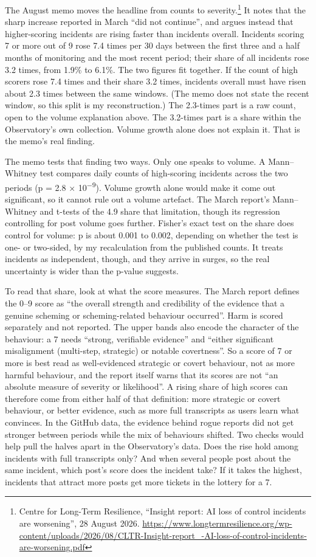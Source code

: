 The August memo moves the headline from counts to severity.\footnote{Centre for Long-Term Resilience, “Insight report: AI loss of control incidents are worsening”, 28 August 2026. \url{https://www.longtermresilience.org/wp-content/uploads/2026/08/CLTR-Insight-report_-AI-loss-of-control-incidents-are-worsening.pdf}} It notes that the sharp increase reported in March “did not continue”, and argues instead that higher-scoring incidents are rising faster than incidents overall. Incidents scoring 7 or more out of 9 rose 7.4 times per 30 days between the first three and a half months of monitoring and the most recent period; their share of all incidents rose 3.2 times, from 1.9\% to 6.1\%. The two figures fit together. If the count of high scorers rose 7.4 times and their share 3.2 times, incidents overall must have risen about 2.3 times between the same windows. (The memo does not state the recent window, so this split is my reconstruction.) The 2.3-times part is a raw count, open to the volume explanation above. The 3.2-times part is a share within the Observatory’s own collection. Volume growth alone does not explain it. That is the memo’s real finding.

The memo tests that finding two ways. Only one speaks to volume. A Mann–Whitney test compares daily counts of high-scoring incidents across the two periods (p = 2.8 × 10\textsuperscript{−9}). Volume growth alone would make it come out significant, so it cannot rule out a volume artefact. The March report’s Mann–Whitney and t-tests of the 4.9 share that limitation, though its regression controlling for post volume goes further. Fisher’s exact test on the share does control for volume: p is about 0.001 to 0.002, depending on whether the test is one- or two-sided, by my recalculation from the published counts. It treats incidents as independent, though, and they arrive in surges, so the real uncertainty is wider than the p-value suggests.

To read that share, look at what the score measures. The March report defines the 0–9 score as “the overall strength and credibility of the evidence that a genuine scheming or scheming-related behaviour occurred”. Harm is scored separately and not reported. The upper bands also encode the character of the behaviour: a 7 needs “strong, verifiable evidence” and “either significant misalignment (multi-step, strategic) or notable covertness”. So a score of 7 or more is best read as well-evidenced strategic or covert behaviour, not as more harmful behaviour, and the report itself warns that its scores are not “an absolute measure of severity or likelihood”. A rising share of high scores can therefore come from either half of that definition: more strategic or covert behaviour, or better evidence, such as more full transcripts as users learn what convinces. In the GitHub data, the evidence behind rogue reports did not get stronger between periods while the mix of behaviours shifted. Two checks would help pull the halves apart in the Observatory’s data. Does the rise hold among incidents with full transcripts only? And when several people post about the same incident, which post’s score does the incident take? If it takes the highest, incidents that attract more posts get more tickets in the lottery for a 7.

